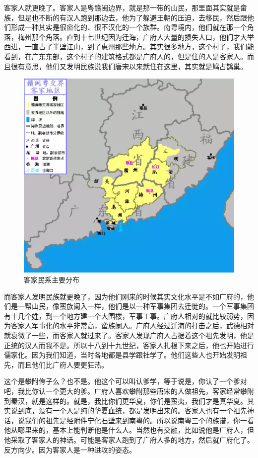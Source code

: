 客家人就更晚了。客家人是粤赣闽边界，就是那一带的山民，那里面其实就是畲族，但是也不断的有汉人跑到那边去，他为了躲避王朝的压迫，去移民，然后跟他们形成一种其实是很畲化的、很不汉化的一个族群。南粤境内，他们就在那一个角落，梅州那个角落。直到十七世纪因为迁海，广府人大量的损失人口，他们才大举西进，一直占了半壁江山，到了惠州那些地方。其实很多地方，这个村子，我们能看到，在广东东部，这个村子的建筑格式都是广府人的，但是住的人是客家人。而且很有意思，他们又发明民族说我们唐宋以来就住在这里，其实就是鸠占鹊巢。


\begin{figure}
	\centering
	\includegraphics[width=\textwidth]{images/image-70}
	\caption{客家民系主要分布}
\end{figure}

而客家人发明民族就更晚了，因为他们刚来的时候其实文化水平是不如广府的，他们是一帮山民，像蛮族阑入一样，他们是以一种军事集团去迁徙的。一个军事集团有十几个姓，到一个地方建一个大围楼，军事工事。广府人相对的就比较弱势，因为客家人军事化的水平非常高，蛮族阑入。广府人经过迁海的打击之后，武德相对就衰微了一些，而客家人就过来了。客家人发现广府人占据着这个祖先发明，他是正统的汉人而我不是。所以十八到十九世纪，客家人扎根下来之后，他也开始进行儒家化。因为我们知道，当时各地都是县学跟社学了。他们这些人也开始发明祖先，而且他们比广府人要更狂热。

这个是攀附侉子么？也不是。他这个可以叫认爹学，等于说是，你认了一个爹对吧，我比你认一个更大的爹。广府人喜欢攀附那些唐宋的人做祖先，客家经常攀附到秦汉，就是这样的。就是，我比你们更华夏，你们是蛮夷，我们才是真华夏。其实说到底，没有一个人是纯的华夏血统，都是发明出来的。客家人也有一个祖先神话，说我们的祖先是经附件宁化石壁来到南粤的。所以说南粤三个的族谱，你一看他从哪里来的，基本上能判断他是什么人。当然也有交融，比如说他是广府人，但他采取了客家人的神话。可能是客家人跑到了广府人多的地方，然后就广府化了。反方向少。因为客家人是一种进攻的姿态。

